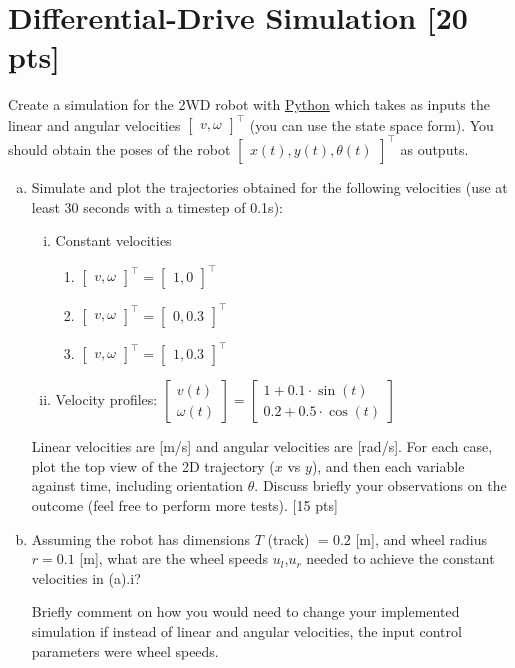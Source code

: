 \section{Differential-Drive Simulation [20 pts]}
Create a simulation for the 2WD robot with \underline{Python} which takes as inputs the linear and angular velocities $\begin{bmatrix}
    v,\omega
\end{bmatrix}^\top$ (you can use the state space form). You should obtain the poses of the robot $\begin{bmatrix}
    x(t),y(t),\theta(t)
\end{bmatrix}^\top$ as outputs. 
\begin{enumerate}[(a)]
    \item Simulate and plot the trajectories obtained for the following velocities (use at least 30 seconds with a timestep of 0.1s):
    \begin{enumerate}[i.]
        \item Constant velocities
        \begin{enumerate} [1.]
            \item $\begin{bmatrix}
    v,\omega
\end{bmatrix}^\top=\begin{bmatrix}
    1,0
\end{bmatrix}^\top$
\item $\begin{bmatrix}
    v,\omega
\end{bmatrix}^\top=\begin{bmatrix}
    0,0.3
\end{bmatrix}^\top$
\item $\begin{bmatrix}
    v,\omega
\end{bmatrix}^\top=\begin{bmatrix}
    1,0.3
\end{bmatrix}^\top$
        \end{enumerate}
        \item Velocity profiles: $\begin{bmatrix}
            v(t)\\\omega(t)
        \end{bmatrix}=\begin{bmatrix}
            1+0.1\cdot\sin(t)\\
            0.2+0.5\cdot\cos(t)
        \end{bmatrix}$
    \end{enumerate}
    Linear velocities are [m/s] and angular velocities are [rad/s]. For each case, plot the top view of the 2D trajectory ($x$ vs $y$), and then each variable against time, including orientation $\theta$. Discuss briefly your observations on the outcome (feel free to perform more tests). [15 pts]
    \item 	Assuming the robot has dimensions $T$ (track) $= 0.2$ [m], and wheel radius $r = 0.1$ [m], what are the wheel speeds $u_l$,$u_r$ needed to achieve the constant velocities in (a).i? 
    
    Briefly comment on how you would need to change your implemented simulation if instead of linear and angular velocities, the input control parameters were wheel speeds.


\end{enumerate}